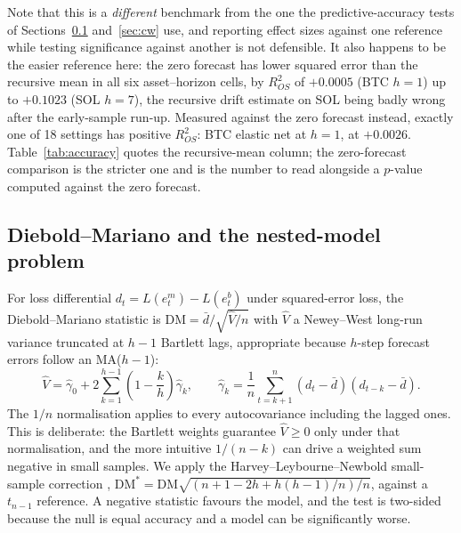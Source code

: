 \documentclass{article}
\theoremstyle{plain}
\theoremstyle{definition}
\newcommand{\rsq}{R^2_{OS}}
\begin{document}
Note that this is a \emph{different} benchmark from the one the predictive-accuracy
tests of Sections~\ref{sec:hac} and~\ref{sec:cw} use, and reporting effect sizes
against one reference while testing significance against another is not defensible.
It also happens to be the easier reference here: the zero forecast has lower squared
error than the recursive mean in all six asset--horizon cells, by $\rsq$ of $+0.0005$
(BTC $h{=}1$) up to $+0.1023$ (SOL $h{=}7$), the recursive drift estimate on SOL being
badly wrong after the early-sample run-up. Measured against the zero forecast instead,
exactly one of 18 settings has positive $\rsq$: BTC elastic net at $h=1$, at
$+0.0026$. Table~\ref{tab:accuracy} quotes the recursive-mean column; the
zero-forecast comparison is the stricter one and is the number to read alongside a
$p$-value computed against the zero forecast.

\subsection{Diebold--Mariano and the nested-model problem}
\label{sec:hac}

For loss differential $d_t = L(e^m_t) - L(e^b_t)$ under squared-error loss, the
Diebold--Mariano statistic \citep{diebold1995} is $\mathrm{DM} = \bar{d}/\sqrt{\hat{V}/n}$
with $\hat V$ a Newey--West long-run variance \citep{newey1987} truncated at $h-1$
Bartlett lags, appropriate because $h$-step forecast errors follow an MA($h-1$):
%
\begin{equation}
  \hat{V} = \hat{\gamma}_0 + 2\sum_{k=1}^{h-1}\left(1 - \frac{k}{h}\right)\hat{\gamma}_k,
  \qquad
  \hat{\gamma}_k = \frac{1}{n}\sum_{t=k+1}^{n}(d_t - \bar{d})(d_{t-k} - \bar{d}).
\end{equation}
%
The $1/n$ normalisation applies to every autocovariance including the lagged ones.
This is deliberate: the Bartlett weights guarantee $\hat V \ge 0$ only under that
normalisation, and the more intuitive $1/(n-k)$ can drive a weighted sum negative
in small samples. We apply the Harvey--Leybourne--Newbold small-sample correction
\citep{harvey1997},
$\mathrm{DM}^{\ast} = \mathrm{DM}\sqrt{(n + 1 - 2h + h(h-1)/n)/n}$, against a
$t_{n-1}$ reference. A negative statistic favours the model, and the test is
two-sided because the null is equal accuracy and a model can be significantly
worse.
\end{document}
